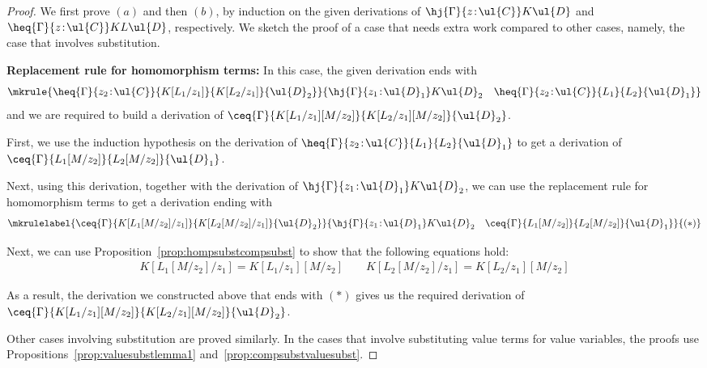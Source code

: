 \begin{proof}
We first prove $(a)$ and then $(b)$, by induction on the given derivations of \linebreak $\hj {\Gamma} {z \!:\! \ul{C}} K \ul{D}$ and $\heq {\Gamma} {z \!:\! \ul{C}} K L \ul{D}$, respectively. 
We sketch the proof of a case that needs extra work compared to other cases, namely, the case that involves substitution.

\vspace{0.2cm}

\noindent \textbf{Replacement rule for homomorphism terms:}
In this case, the given derivation ends with
\[
\mkrule
{\heq {\Gamma} {z_2 \!:\! \ul{C}} {K[L_1/z_1]} {K[L_2/z_1]} {\ul{D}_2}}
{\hj {\Gamma} {z_1 \!:\! \ul{D}_1} K {\ul{D}_2} \quad \heq {\Gamma} {z_2 \!:\! \ul{C}} {L_1} {L_2} {\ul{D}_1}}
\]
and we are required to build a derivation of $\ceq {\Gamma} {K[L_1/z_1][M/z_2]} {K[L_2/z_1][M/z_2]} {\ul{D}_2}$.

First, we use the induction hypothesis on the derivation of  $\heq {\Gamma} {z_2 \!:\! \ul{C}} {L_1} {L_2} {\ul{D}_1}$ to get a derivation of $\ceq {\Gamma} {L_1[M/z_2]} {L_2[M/z_2]} {\ul{D}_1}$. 

Next, using this derivation, together with the derivation of $\hj {\Gamma} {z_1 \!:\! \ul{D}_1} K {\ul{D}_2}$, we can use the replacement rule for homomorphism terms to get a derivation ending with
\[
\mkrulelabel
{\ceq {\Gamma} {K[L_1[M/z_2]/z_1]} {K[L_2[M/z_2]/z_1]} {\ul{D}_2}}
{\hj {\Gamma} {z_1 \!:\! \ul{D}_1} K {\ul{D}_2} \quad \ceq {\Gamma} {L_1[M/z_2]} {L_2[M/z_2]} {\ul{D}_1}}
{(*)}
\]

Next, we can use Proposition~\ref{prop:hompsubstcompsubst} to show that the following equations hold: 
\[
\begin{array}{c}
K[L_1[M/z_2]/z_1] = K[L_1/z_1][M/z_2]
\qquad
K[L_2[M/z_2]/z_1] = K[L_2/z_1][M/z_2]
\end{array}
\]

As a result,  the derivation we constructed above that ends with $(*)$ gives us the required derivation of 
$\ceq {\Gamma} {K[L_1/z_1][M/z_2]} {K[L_2/z_1][M/z_2]} {\ul{D}_2}$.

Other cases involving substitution are proved similarly. In the cases that involve substituting value terms for value variables, the proofs use Propositions~\ref{prop:valuesubstlemma1} and~\ref{prop:compsubstvaluesubst}.
\end{proof}




